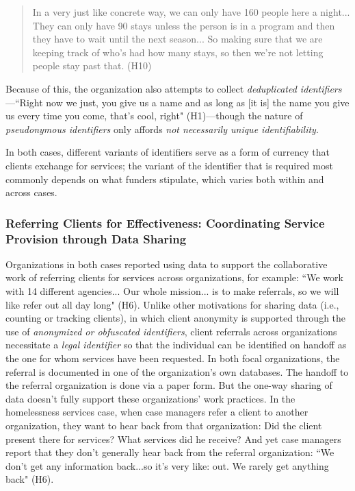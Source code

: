 \begin{quote}\singlespacing In a very just like concrete way, we can only have 160 people here a night... They can only have 90 stays unless the person is in a program and then they have to wait until the next season... So making sure that we are keeping track of who's had how many stays, so then we're not letting people stay past that. (H10)\end{quote}

Because of this, the organization also attempts to collect \textit{deduplicated identifiers}---``Right now we just, you give us a name and as long as [it is] the name you give us every time you come, that's cool, right" (H1)---though the nature of \textit{pseudonymous identifiers} only affords \textit{not necessarily unique identifiability}.

In both cases, different variants of identifiers serve as a form of currency that clients exchange for services; the variant of the identifier that is required most commonly depends on what funders stipulate, which varies both within and across cases.  

\subsubsection{Referring Clients for Effectiveness: Coordinating Service Provision through Data Sharing}
Organizations in both cases reported using data to support the collaborative work of referring clients for services across organizations, for example: ``We work with 14 different agencies... Our whole mission... is to make referrals, so we will like refer out all day long" (H6). Unlike other motivations for sharing data (i.e., counting or tracking clients), in which client anonymity is supported through the use of \textit{anonymized or obfuscated identifiers}, client referrals across organizations necessitate a \textit{legal identifier} so that the individual can be identified on handoff as the one for whom services have been requested. In both focal organizations, the referral is documented in one of the organization's own databases. The handoff to the referral organization is done via a paper form. But the one-way sharing of data doesn't fully support these organizations' work practices. In the homelessness services case, when case managers refer a client to another organization, they want to hear back from that organization: Did the client present there for services? What services did he receive? And yet case managers report that they don't generally hear back from the referral organization: ``We don't get any information back...so it's very like: out.  We rarely get anything back" (H6).

